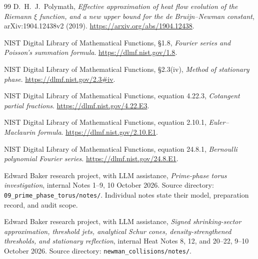 \documentclass[11pt]{article}
\numberwithin{equation}{section}
\theoremstyle{definition}
\theoremstyle{remark}
\begin{document}
\begin{thebibliography}{99}
D.\ H.\ J.\ Polymath,
\emph{Effective approximation of heat flow evolution of the Riemann
$\xi$ function, and a new upper bound for the de Bruijn--Newman constant},
arXiv:1904.12438v2 (2019).
\url{https://arxiv.org/abs/1904.12438}.

NIST Digital Library of Mathematical Functions, \S1.8,
\emph{Fourier series and Poisson's summation formula}.
\url{https://dlmf.nist.gov/1.8}.

NIST Digital Library of Mathematical Functions, \S2.3(iv),
\emph{Method of stationary phase}.
\url{https://dlmf.nist.gov/2.3#iv}.

NIST Digital Library of Mathematical Functions, equation 4.22.3,
\emph{Cotangent partial fractions}.
\url{https://dlmf.nist.gov/4.22.E3}.

NIST Digital Library of Mathematical Functions, equation 2.10.1,
\emph{Euler--Maclaurin formula}.
\url{https://dlmf.nist.gov/2.10.E1}.

NIST Digital Library of Mathematical Functions, equation 24.8.1,
\emph{Bernoulli polynomial Fourier series}.
\url{https://dlmf.nist.gov/24.8.E1}.

Edward Baker research project, with LLM assistance,
\emph{Prime-phase torus investigation}, internal Notes 1--9,
10 October 2026. Source directory:
\texttt{09\_prime\_phase\_torus/notes/}.
Individual notes state their model, preparation record, and audit scope.

Edward Baker research project, with LLM assistance,
\emph{Signed shrinking-sector approximation, threshold jets, analytical
Schur cones, density-strengthened thresholds, and stationary reflection},
internal Heat Notes 8, 12, and 20--22, 9--10 October 2026.
Source directory: \texttt{newman\_collisions/notes/}.
\end{thebibliography}
\end{document}

